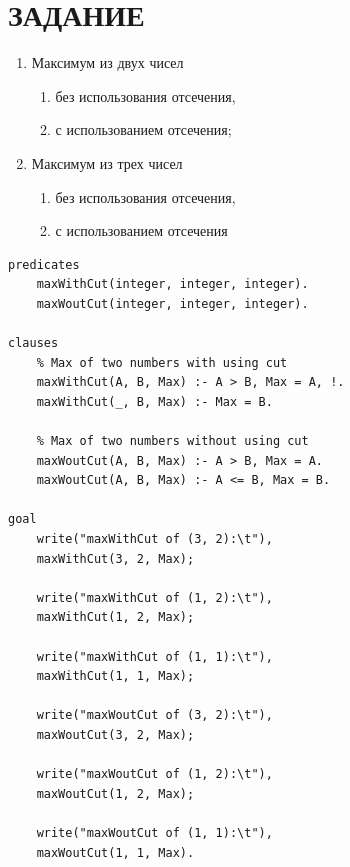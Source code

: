 \section{ЗАДАНИЕ}

\begin{enumerate}
    \item Максимум из двух чисел
        \begin{enumerate}
            \item без использования отсечения,
            \item с использованием отсечения;
        \end{enumerate}
    \item Максимум из трех чисел
        \begin{enumerate}
            \item без использования отсечения,
            \item с использованием отсечения
        \end{enumerate}
\end{enumerate}


\begin{lstlisting}[caption=Максимум 2 чисел]
predicates
	maxWithCut(integer, integer, integer).
	maxWoutCut(integer, integer, integer).

clauses
	% Max of two numbers with using cut
	maxWithCut(A, B, Max) :- A > B, Max = A, !.
	maxWithCut(_, B, Max) :- Max = B.

	% Max of two numbers without using cut
	maxWoutCut(A, B, Max) :- A > B, Max = A.
	maxWoutCut(A, B, Max) :- A <= B, Max = B.

goal
	write("maxWithCut of (3, 2):\t"),
	maxWithCut(3, 2, Max);

	write("maxWithCut of (1, 2):\t"),
	maxWithCut(1, 2, Max);
	
	write("maxWithCut of (1, 1):\t"),
	maxWithCut(1, 1, Max);

	write("maxWoutCut of (3, 2):\t"),
	maxWoutCut(3, 2, Max);

	write("maxWoutCut of (1, 2):\t"),
	maxWoutCut(1, 2, Max);

	write("maxWoutCut of (1, 1):\t"),
	maxWoutCut(1, 1, Max).
\end{lstlisting}


